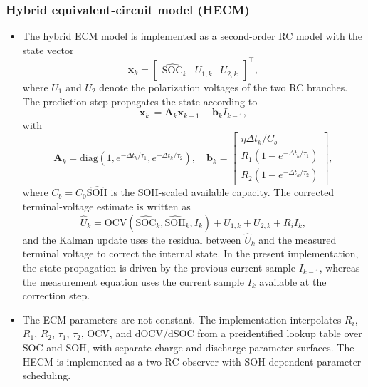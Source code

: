 \documentclass[review]{elsarticle}
\begin{document}
\subsubsection{Hybrid equivalent-circuit model (HECM)}
\begin{itemize}[leftmargin=*]
    \item The hybrid ECM model is implemented as a second-order RC model with the state vector
    \begin{equation}
        \mathbf{x}_k = \begin{bmatrix}\widehat{\mathrm{SOC}}_k & U_{1,k} & U_{2,k}\end{bmatrix}^{\top},
        \label{eq:ecm_state}
    \end{equation}
    where $U_1$ and $U_2$ denote the polarization voltages of the two RC branches. The prediction step propagates the state according to
    \begin{equation}
        \mathbf{x}_{k}^{-}=\mathbf{A}_k \mathbf{x}_{k-1}+\mathbf{b}_k I_{k-1},
        \label{eq:ecm_prediction}
    \end{equation}
    with
    \begin{equation}
        \mathbf{A}_k=\mathrm{diag}\!\left(1,e^{-\Delta t_k/\tau_1},e^{-\Delta t_k/\tau_2}\right),
        \quad
        \mathbf{b}_k=
        \begin{bmatrix}
            \eta \Delta t_k / C_b \\
            R_1\!\left(1-e^{-\Delta t_k/\tau_1}\right) \\
            R_2\!\left(1-e^{-\Delta t_k/\tau_2}\right)
        \end{bmatrix},
        \label{eq:ecm_ab}
    \end{equation}
    where $C_b=C_0 \widehat{\mathrm{SOH}}$ is the SOH-scaled available capacity. The corrected terminal-voltage estimate is written as
    \begin{equation}
        \widehat{U}_k = \mathrm{OCV}(\widehat{\mathrm{SOC}}_k,\widehat{\mathrm{SOH}}_k,I_k) + U_{1,k} + U_{2,k} + R_i I_k,
        \label{eq:ecm_voltage}
    \end{equation}
    and the Kalman update uses the residual between $\widehat{U}_k$ and the measured terminal voltage to correct the internal state. In the present implementation, the state propagation is driven by the previous current sample $I_{k-1}$, whereas the measurement equation uses the current sample $I_k$ available at the correction step.
    \item The ECM parameters are not constant. The implementation interpolates $R_i$, $R_1$, $R_2$, $\tau_1$, $\tau_2$, $\mathrm{OCV}$, and $\mathrm{dOCV}/\mathrm{dSOC}$ from a preidentified lookup table over SOC and SOH, with separate charge and discharge parameter surfaces. The HECM is implemented as a two-RC observer with SOH-dependent parameter scheduling.
\end{itemize}
\end{document}
